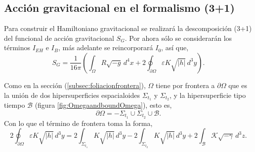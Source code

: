 
\subsection{Acci\'{o}n gravitacional en el formalismo (3+1)}

Para construir el Hamiltoniano gravitacional se realizar\'{a} la descomposici\'{o}n (3+1) del funcional de acci\'{o}n gravitacional $S_{G}$. Por ahora s\'{o}lo se considerar\'{a}n los t\'{e}rminos $I_{EH}$ e $I_{B}$, m\'{a}s adelante se reincorporar\'{a} $I_{0}$, as\'{i} que,
%
\begin{equation}
\label{eq:SGIEHIB}
S_{G} = \frac{1}{16 \pi} \left( \int_{\Omega} R \sqrt{-g} \, d^{4} x + 2 \oint_{\partial \Omega} \varepsilon K \sqrt{|h|} \, d^{3} y \right).
\end{equation}

Como en la secci\'{o}n (\ref{subsec:foliacionfrontera}), $\Omega$ tiene por frontera a $\partial \Omega$ que es la uni\'{o}n de dos hipersuperficies espacialoides $\Sigma_{t_{1}}$ y $\Sigma_{t_{2}}$, y la hipersuperficie tipo tiempo $\mathcal{B}$ (figura \ref{fig:OmegaandboundOmega}), esto es,
%
\begin{equation}
\label{eq:domegaU}
\partial \Omega  = -\Sigma_{t_{1}} \cup \Sigma_{t_{2}} \cup \mathcal{B}.
\end{equation}
%
Con lo que el t\'{e}rmino de frontera toma la forma,
%
\begin{equation}
\label{eq:IB31}
2 \oint_{\partial \Omega} \varepsilon K \sqrt{|h|} \, d^{3} y = 2 \int_{\Sigma_{t_1}} K \sqrt{|h|} \, d^{3} y - 2 \int_{\Sigma_{t_2}} K \sqrt{|h|} \, d^{3} y + 2 \int_{\mathcal{B}} \mathcal{K} \sqrt{-\gamma} \, d^{3} z.
\end{equation}

